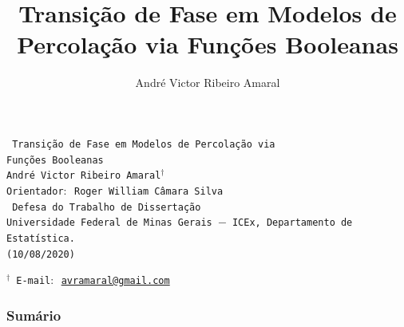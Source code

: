 \documentclass[9pt]{beamer}
\title{Transição de Fase em Modelos de Percolação via Funções Booleanas}
\author[André V. R. Amaral]{André Victor Ribeiro Amaral}
\theoremstyle{definition} %
\begin{document}
	\AtBeginSection{} %
	
	\begin{frame}[t]
		\centering
		\vspace{40pt}
		\texttt{{\Large {} Transição de Fase em Modelos de Percolação via \\ Funções Booleanas}} \\
		\vspace{26pt}
		\texttt{{\normalsize André Victor Ribeiro Amaral${}^{\dagger}$}} \\
		\texttt{{\small Orientador$:$ Roger William Câmara Silva}}\\
		\vspace{26pt}
		\texttt{{\normalsize {} Defesa do Trabalho de Dissertação}} \\
		\vspace{26pt}
		\texttt{{\small Universidade Federal de Minas Gerais $-$ ICEx, Departamento de Estatística.}}\\
		\texttt{{\small (10/08/2020)}} \\
		\vspace{26pt}
		\begin{flushleft} \texttt{{\scriptsize ${}^{\dagger}$~E-mail$:$ \href{mailto:avramaral@gmail.com}{avramaral@gmail.com}}} \end{flushleft}
		
	\end{frame}

	\begin{frame}[t]
		\frametitle{Sumário}
		\tableofcontents
	\end{frame}
\end{document}
